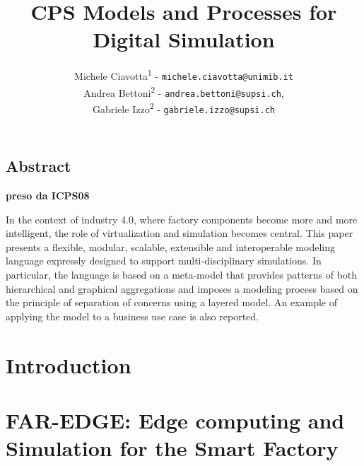 \documentclass{riverk}
\begin{document}
\setcounter{article}{7}

\begin{opening}
\title[CPS Models and Processes for Digital Simulation]{CPS Models and Processes for Digital Simulation %
            }
\author{Michele Ciavotta\textsuperscript{1} - \texttt{michele.ciavotta@unimib.it}\\
        Andrea Bettoni\textsuperscript{2} - \texttt{andrea.bettoni@supsi.ch},\\
	    Gabriele Izzo\textsuperscript{2} - \texttt{gabriele.izzo@supsi.ch}}
\end{opening}

\subsection*{Abstract}
\textbf{preso da ICPS08}

In the context of industry 4.0, where factory components become more and more intelligent, the role of virtualization and simulation becomes central. This paper presents a flexible, modular, scalable, extensible and interoperable modeling language expressly designed to support multi-disciplinary simulations. In particular, the language is based on a meta-model that provides patterns of both hierarchical and graphical aggregations and imposes a modeling process based on the principle of separation of concerns using a layered model. An example of applying the model to a business use case is also reported. 


\section{Introduction} 


\section{FAR-EDGE: Edge computing and Simulation for the Smart Factory}

\end{document}
